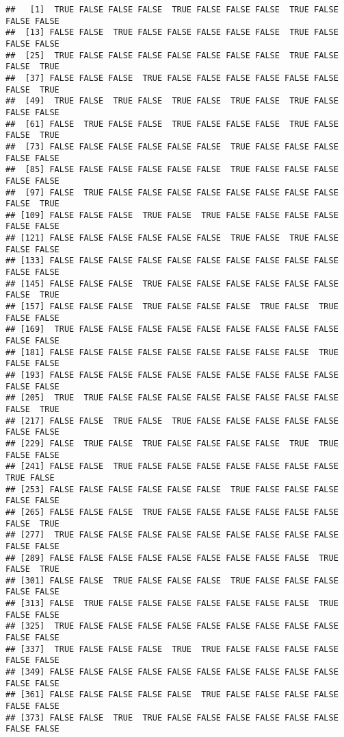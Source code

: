 \documentclass[
]{book}
\begin{document}
\begin{verbatim}
##   [1]  TRUE FALSE FALSE FALSE  TRUE FALSE FALSE FALSE  TRUE FALSE FALSE FALSE
##  [13] FALSE FALSE  TRUE FALSE FALSE FALSE FALSE FALSE  TRUE FALSE FALSE FALSE
##  [25]  TRUE FALSE FALSE FALSE FALSE FALSE FALSE FALSE  TRUE FALSE FALSE  TRUE
##  [37] FALSE FALSE FALSE  TRUE FALSE FALSE FALSE FALSE FALSE FALSE FALSE  TRUE
##  [49]  TRUE FALSE  TRUE FALSE  TRUE FALSE  TRUE FALSE  TRUE FALSE FALSE FALSE
##  [61] FALSE  TRUE FALSE FALSE  TRUE FALSE FALSE FALSE  TRUE FALSE FALSE  TRUE
##  [73] FALSE FALSE FALSE FALSE FALSE FALSE  TRUE FALSE FALSE FALSE FALSE FALSE
##  [85] FALSE FALSE FALSE FALSE FALSE FALSE  TRUE FALSE FALSE FALSE FALSE FALSE
##  [97] FALSE  TRUE FALSE FALSE FALSE FALSE FALSE FALSE FALSE FALSE FALSE  TRUE
## [109] FALSE FALSE FALSE  TRUE FALSE  TRUE FALSE FALSE FALSE FALSE FALSE FALSE
## [121] FALSE FALSE FALSE FALSE FALSE FALSE  TRUE FALSE  TRUE FALSE FALSE FALSE
## [133] FALSE FALSE FALSE FALSE FALSE FALSE FALSE FALSE FALSE FALSE FALSE FALSE
## [145] FALSE FALSE FALSE  TRUE FALSE FALSE FALSE FALSE FALSE FALSE FALSE  TRUE
## [157] FALSE FALSE FALSE  TRUE FALSE FALSE FALSE  TRUE FALSE  TRUE FALSE FALSE
## [169]  TRUE FALSE FALSE FALSE FALSE FALSE FALSE FALSE FALSE FALSE FALSE FALSE
## [181] FALSE FALSE FALSE FALSE FALSE FALSE FALSE FALSE FALSE  TRUE FALSE FALSE
## [193] FALSE FALSE FALSE FALSE FALSE FALSE FALSE FALSE FALSE FALSE FALSE FALSE
## [205]  TRUE  TRUE FALSE FALSE FALSE FALSE FALSE FALSE FALSE FALSE FALSE  TRUE
## [217] FALSE FALSE  TRUE FALSE  TRUE FALSE FALSE FALSE FALSE FALSE FALSE FALSE
## [229] FALSE  TRUE FALSE  TRUE FALSE FALSE FALSE FALSE  TRUE  TRUE FALSE FALSE
## [241] FALSE FALSE  TRUE FALSE FALSE FALSE FALSE FALSE FALSE FALSE  TRUE FALSE
## [253] FALSE FALSE FALSE FALSE FALSE FALSE  TRUE FALSE FALSE FALSE FALSE FALSE
## [265] FALSE FALSE FALSE  TRUE FALSE FALSE FALSE FALSE FALSE FALSE FALSE  TRUE
## [277]  TRUE FALSE FALSE FALSE FALSE FALSE FALSE FALSE FALSE FALSE FALSE FALSE
## [289] FALSE FALSE FALSE FALSE FALSE FALSE FALSE FALSE FALSE  TRUE FALSE  TRUE
## [301] FALSE FALSE  TRUE FALSE FALSE FALSE  TRUE FALSE FALSE FALSE FALSE FALSE
## [313] FALSE  TRUE FALSE FALSE FALSE FALSE FALSE FALSE FALSE  TRUE FALSE FALSE
## [325]  TRUE FALSE FALSE FALSE FALSE FALSE FALSE FALSE FALSE FALSE FALSE FALSE
## [337]  TRUE FALSE FALSE FALSE  TRUE  TRUE FALSE FALSE FALSE FALSE FALSE FALSE
## [349] FALSE FALSE FALSE FALSE FALSE FALSE FALSE FALSE FALSE FALSE FALSE FALSE
## [361] FALSE FALSE FALSE FALSE FALSE  TRUE FALSE FALSE FALSE FALSE FALSE FALSE
## [373] FALSE FALSE  TRUE  TRUE FALSE FALSE FALSE FALSE FALSE FALSE FALSE FALSE

\end{verbatim}
\end{document}
